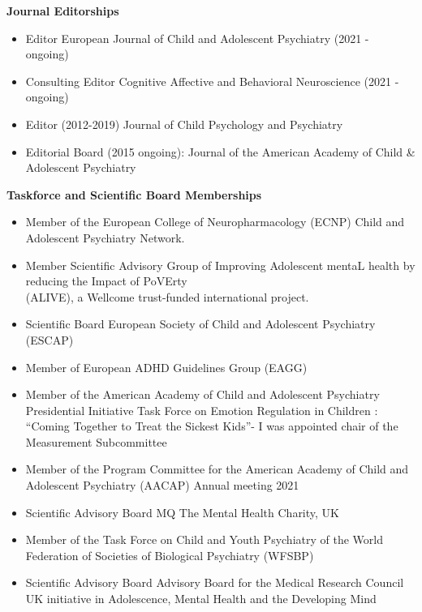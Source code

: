\documentclass[
]{article}
\providecommand{\tightlist}{%
  \setlength{\itemsep}{0pt}\setlength{\parskip}{0pt}}
\begin{document}
\textbf{Journal Editorships}

\begin{itemize}
\tightlist
\item
  Editor European Journal of Child and Adolescent Psychiatry (2021 -
  ongoing)
\item
  Consulting Editor Cognitive Affective and Behavioral Neuroscience
  (2021 - ongoing)
\item
  Editor (2012-2019) Journal of Child Psychology and Psychiatry
\item
  Editorial Board (2015 ongoing): Journal of the American Academy of
  Child \& Adolescent Psychiatry
\end{itemize}

\textbf{Taskforce and Scientific Board Memberships}

\begin{itemize}
\tightlist
\item
  Member of the European College of Neuropharmacology (ECNP) Child and
  Adolescent Psychiatry Network.\\
\item
  Member Scientific Advisory Group of Improving Adolescent mentaL health
  by reducing the Impact of PoVErty\\
  (ALIVE), a Wellcome trust-funded international project.
\item
  Scientific Board European Society of Child and Adolescent Psychiatry
  (ESCAP)
\item
  Member of European ADHD Guidelines Group (EAGG)
\item
  Member of the American Academy of Child and Adolescent Psychiatry
  Presidential Initiative Task Force on Emotion Regulation in Children :
  ``Coming Together to Treat the Sickest Kids''- I was appointed chair
  of the Measurement Subcommittee
\item
  Member of the Program Committee for the American Academy of Child and
  Adolescent Psychiatry (AACAP) Annual meeting 2021
\item
  Scientific Advisory Board MQ The Mental Health Charity, UK
\item
  Member of the Task Force on Child and Youth Psychiatry of the World
  Federation of Societies of Biological Psychiatry (WFSBP)
\item
  Scientific Advisory Board Advisory Board for the Medical Research
  Council UK initiative in Adolescence, Mental Health and the Developing
  Mind
\end{itemize}
\end{document}
